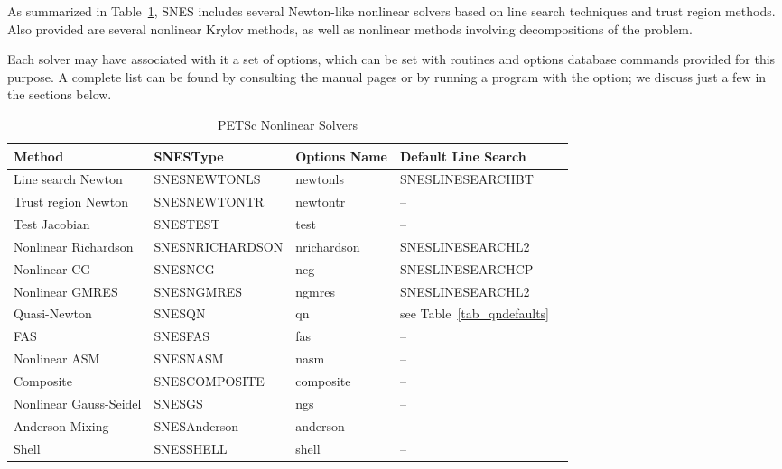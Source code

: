 As summarized in Table~\ref{tab_snesdefaults}, SNES includes several Newton-like nonlinear solvers based on line search
techniques and trust region methods.  Also provided are several nonlinear Krylov methods, as well as nonlinear
methods involving decompositions of the problem.

Each solver may have associated with it a set of options, which can be
set with routines and options database commands provided for this
purpose.  A complete list can be found by consulting the manual pages
or by running a program with the  option; we discuss just a
few in the sections below.

\begin{table}
\begin{center}
\begin{tabular}{lllll}
{\bf Method}    &{\bf SNESType}& {\bf Options Name}          & {\bf Default Line Search} \\
\hline
Line search Newton           & SNESNEWTONLS    & newtonls    & SNESLINESEARCHBT  \\
Trust region Newton          & SNESNEWTONTR    & newtontr    & --                \\
Test Jacobian                & SNESTEST        & test        & --                \\
Nonlinear Richardson         & SNESNRICHARDSON & nrichardson & SNESLINESEARCHL2  \\
Nonlinear CG                 & SNESNCG         & ncg         & SNESLINESEARCHCP  \\
Nonlinear GMRES              & SNESNGMRES      & ngmres      & SNESLINESEARCHL2  \\
Quasi-Newton                 & SNESQN          & qn          & see Table~\ref{tab_qndefaults} \\
FAS                          & SNESFAS         & fas         & --                \\
Nonlinear ASM                & SNESNASM        & nasm        & --                \\
Composite                    & SNESCOMPOSITE   & composite   & --                \\
Nonlinear Gauss-Seidel       & SNESGS          & ngs         & --                \\
Anderson Mixing              & SNESAnderson    & anderson    & --                \\
Shell                        & SNESSHELL       & shell       & --                \\
\hline
\end{tabular}
\end{center}
\caption{PETSc Nonlinear Solvers}
\label{tab_snesdefaults}
\end{table}

